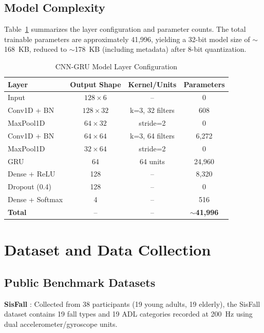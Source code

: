\documentclass[conference]{IEEEtran}
\begin{document}
\subsection{Model Complexity}

Table~\ref{tab:modelparams} summarizes the layer configuration and parameter counts. The total trainable parameters are approximately 41,996, yielding a 32-bit model size of $\sim$168~KB, reduced to $\sim$178~KB (including metadata) after 8-bit quantization.

\begin{table}[!t]
\caption{CNN-GRU Model Layer Configuration}
\label{tab:modelparams}
\centering
\footnotesize
\begin{tabular}{|l|c|c|c|}
\hline
\textbf{Layer} & \textbf{Output Shape} & \textbf{Kernel/Units} & \textbf{Parameters} \\
\hline
Input & $128 \times 6$ & -- & 0 \\
\hline
Conv1D + BN & $128 \times 32$ & k=3, 32 filters & 608 \\
\hline
MaxPool1D & $64 \times 32$ & stride=2 & 0 \\
\hline
Conv1D + BN & $64 \times 64$ & k=3, 64 filters & 6,272 \\
\hline
MaxPool1D & $32 \times 64$ & stride=2 & 0 \\
\hline
GRU & 64 & 64 units & 24,960 \\
\hline
Dense + ReLU & 128 & -- & 8,320 \\
\hline
Dropout (0.4) & 128 & -- & 0 \\
\hline
Dense + Softmax & 4 & -- & 516 \\
\hline
\textbf{Total} & -- & -- & \textbf{$\sim$41,996} \\
\hline
\end{tabular}
\end{table}

\section{Dataset and Data Collection}

\subsection{Public Benchmark Datasets}

\textbf{SisFall} \cite{b30}: Collected from 38 participants (19 young adults, 19 elderly), the SisFall dataset contains 19 fall types and 19 ADL categories recorded at 200~Hz using dual accelerometer/gyroscope units.
\end{document}
